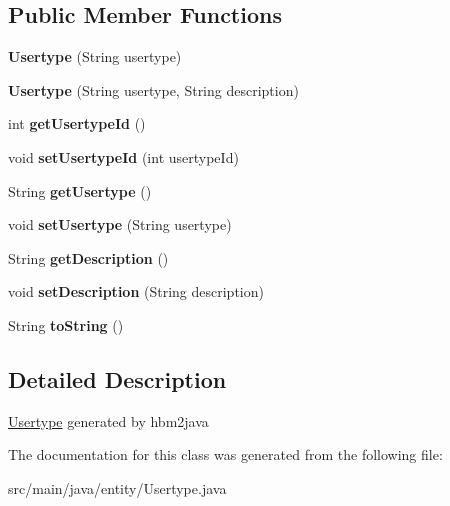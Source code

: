 \subsection*{Public Member Functions}
\begin{DoxyCompactItemize}
\item 
\mbox{\label{classentity_1_1_usertype_a3f17f72e004920b8d0099586a5b016fe}} 
{\bfseries Usertype} (String usertype)
\item 
\mbox{\label{classentity_1_1_usertype_aa9776ce9c7de7443a232c0531d78ea8b}} 
{\bfseries Usertype} (String usertype, String description)
\item 
\mbox{\label{classentity_1_1_usertype_a361cfd2f23d71f1ec7e69aa55e5f013c}} 
int {\bfseries get\+Usertype\+Id} ()
\item 
\mbox{\label{classentity_1_1_usertype_ad05f418dbd08027c7afac5e4af7d2254}} 
void {\bfseries set\+Usertype\+Id} (int usertype\+Id)
\item 
\mbox{\label{classentity_1_1_usertype_ad300a2783e57d8690d9db0c3b464737b}} 
String {\bfseries get\+Usertype} ()
\item 
\mbox{\label{classentity_1_1_usertype_ac4220b848c369fd726b0c8bebc8dbcf3}} 
void {\bfseries set\+Usertype} (String usertype)
\item 
\mbox{\label{classentity_1_1_usertype_a1699b78e303deb9b70224bf863b08063}} 
String {\bfseries get\+Description} ()
\item 
\mbox{\label{classentity_1_1_usertype_ab274da7bcfaa15606599fc856b958d24}} 
void {\bfseries set\+Description} (String description)
\item 
\mbox{\label{classentity_1_1_usertype_a4211735d5a357a4dbd778c1b1aa4b7e0}} 
String {\bfseries to\+String} ()
\end{DoxyCompactItemize}


\subsection{Detailed Description}
\mbox{\hyperlink{classentity_1_1_usertype}{Usertype}} generated by hbm2java 

The documentation for this class was generated from the following file\+:\begin{DoxyCompactItemize}
\item 
src/main/java/entity/Usertype.\+java\end{DoxyCompactItemize}
